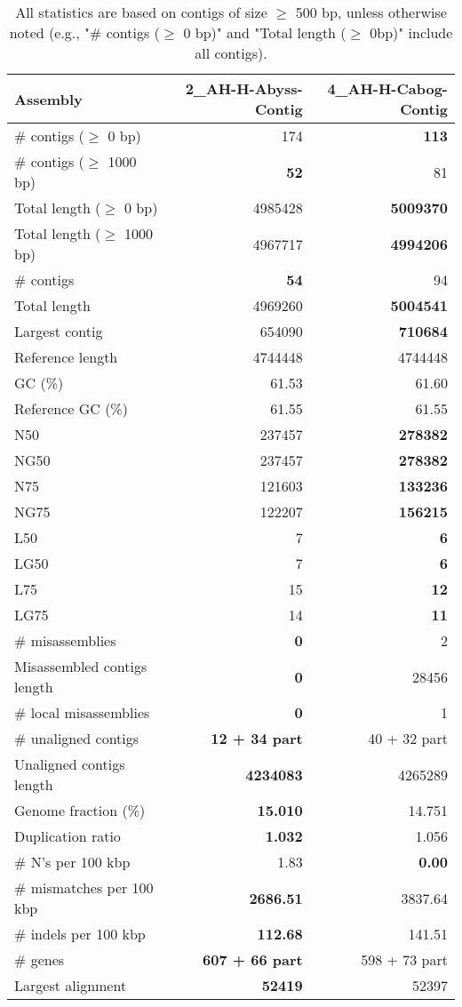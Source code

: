 \documentclass[12pt,a4paper]{article}
\begin{document}
\begin{table}[ht]
\begin{center}
\caption{All statistics are based on contigs of size $\geq$ 500 bp, unless otherwise noted (e.g., "\# contigs ($\geq$ 0 bp)" and "Total length ($\geq$ 0bp)" include all contigs).}
\begin{tabular}{|l*{2}{|r}|}
\hline
Assembly & 2\_AH-H-Abyss-Contig & 4\_AH-H-Cabog-Contig \\ \hline
\# contigs ($\geq$ 0 bp) & 174 & {\bf 113} \\ \hline
\# contigs ($\geq$ 1000 bp) & {\bf 52} & 81 \\ \hline
Total length ($\geq$ 0 bp) & 4985428 & {\bf 5009370} \\ \hline
Total length ($\geq$ 1000 bp) & 4967717 & {\bf 4994206} \\ \hline
\# contigs & {\bf 54} & 94 \\ \hline
Total length & 4969260 & {\bf 5004541} \\ \hline
Largest contig & 654090 & {\bf 710684} \\ \hline
Reference length & 4744448 & 4744448 \\ \hline
GC (\%) & 61.53 & 61.60 \\ \hline
Reference GC (\%) & 61.55 & 61.55 \\ \hline
N50 & 237457 & {\bf 278382} \\ \hline
NG50 & 237457 & {\bf 278382} \\ \hline
N75 & 121603 & {\bf 133236} \\ \hline
NG75 & 122207 & {\bf 156215} \\ \hline
L50 & 7 & {\bf 6} \\ \hline
LG50 & 7 & {\bf 6} \\ \hline
L75 & 15 & {\bf 12} \\ \hline
LG75 & 14 & {\bf 11} \\ \hline
\# misassemblies & {\bf 0} & 2 \\ \hline
Misassembled contigs length & {\bf 0} & 28456 \\ \hline
\# local misassemblies & {\bf 0} & 1 \\ \hline
\# unaligned contigs & {\bf 12 + 34 part} & 40 + 32 part \\ \hline
Unaligned contigs length & {\bf 4234083} & 4265289 \\ \hline
Genome fraction (\%) & {\bf 15.010} & 14.751 \\ \hline
Duplication ratio & {\bf 1.032} & 1.056 \\ \hline
\# N's per 100 kbp & 1.83 & {\bf 0.00} \\ \hline
\# mismatches per 100 kbp & {\bf 2686.51} & 3837.64 \\ \hline
\# indels per 100 kbp & {\bf 112.68} & 141.51 \\ \hline
\# genes & {\bf 607 + 66 part} & 598 + 73 part \\ \hline
Largest alignment & {\bf 52419} & 52397 \\ \hline
\end{tabular}
\end{center}
\end{table}
\end{document}
